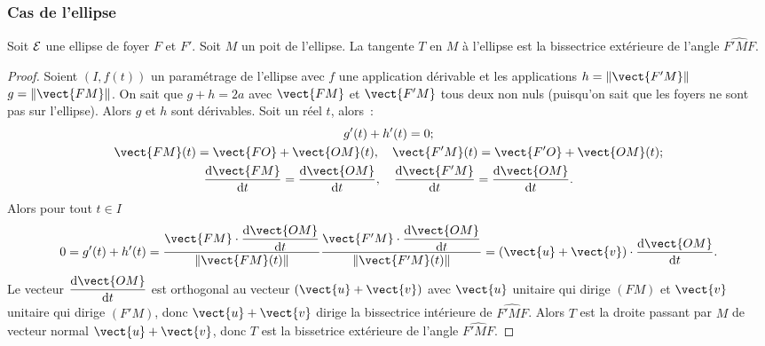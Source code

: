 \subsubsection{Cas de l'ellipse}
\begin{prop}
  Soit $\mathcal{E}$ une ellipse de foyer $F$ et $F'$. Soit $M$ un poit de l'ellipse. La tangente $T$ en $M$ à l'ellipse est la bissectrice extérieure de l'angle $\widehat{F'MF}$.
\end{prop}
\begin{proof}
  Soient $(I,f(t))$ un paramétrage de l'ellipse avec $f$ une application dérivable et les applications $h=\norme{\vect{F'M}}$ $g=\norme{\vect{FM}}$. On sait que $g+h=2a$ avec $\vect{FM}$ et $\vect{F'M}$ tous deux non nuls (puisqu'on sait que les foyers ne sont pas sur l'ellipse). Alors $g$ et $h$ sont dérivables. Soit un réel $t$, alors~:
\begin{gather}
  g'(t)+h'(t)=0; \\
  \vect{FM}(t)=\vect{FO}+\vect{OM}(t), \quad \vect{F'M}(t)=\vect{F'O}+\vect{OM}(t);\\
  \derived{\vect{FM}}{t}=\derived{\vect{OM}}{t}, \quad \derived{\vect{F'M}}{t}=\derived{\vect{OM}}{t}.
\end{gather}
  Alors pour tout $t \in I$
  \begin{equation}
    0=g'(t)+h'(t)=\frac{\vect{FM}\cdot\derived{\vect{OM}}{t}}{\norme{\vect{FM}(t)}}\frac{\vect{F'M}\cdot\derived{\vect{OM}}{t}}{\norme{\vect{F'M}(t)}}=(\vect{u}+\vect{v})\cdot \derived{\vect{OM}}{t}.
  \end{equation}
Le vecteur $\derived{\vect{OM}}{t}$ est orthogonal au vecteur $(\vect{u}+\vect{v})$ avec $\vect{u}$ unitaire qui dirige $(FM)$ et $\vect{v}$ unitaire qui dirige $(F'M)$, donc $\vect{u}+\vect{v}$ dirige la bissectrice intérieure de $\widehat{F'MF}$. Alors $T$ est la droite passant par $M$ de vecteur normal $\vect{u}+\vect{v}$, donc $T$ est la bissetrice extérieure de l'angle $\widehat{F'MF}$.
\end{proof}

